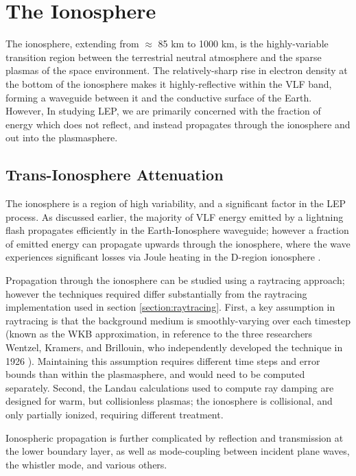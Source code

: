 \section{The Ionosphere}
The ionosphere, extending from $\approx$ 85 km to 1000 km, is the highly-variable transition region between the terrestrial neutral atmosphere and the sparse plasmas of the space environment. The relatively-sharp rise in electron density at the bottom of the ionosphere makes it highly-reflective within the VLF band, forming a waveguide between it and the conductive surface of the Earth. However, In studying LEP, we are primarily concerned with the fraction of energy which does not reflect, and instead propagates through the ionosphere and out into the plasmasphere.

\subsection{Trans-Ionosphere Attenuation}
\label{section:trans_ionosphere_atten}
The ionosphere is a region of high variability, and a significant factor in the LEP process. As discussed earlier, the majority of VLF energy emitted by a lightning flash propagates efficiently in the Earth-Ionosphere waveguide; however a fraction of emitted energy can propagate upwards through the ionosphere, where the wave experiences significant losses via Joule heating in the D-region ionosphere \citep{Graf2013, Blaes2016}.

Propagation through the ionosphere can be studied using a raytracing approach; however the techniques required differ substantially from the raytracing implementation used in section \ref{section:raytracing}. First, a key assumption in raytracing is that the background medium is smoothly-varying over each timestep (known as the WKB approximation, in reference to the three researchers Wentzel, Kramers, and Brillouin, who independently developed the technique in 1926 \citep{Bender1999}). Maintaining this assumption requires different time steps and error bounds than within the plasmasphere, and would need to be computed separately. Second, the Landau calculations used to compute ray damping are designed for warm, but collisionless plasmas; the ionosphere is collisional, and only partially ionized, requiring different treatment.

Ionospheric propagation is further complicated by reflection and transmission at the lower boundary layer, as well as mode-coupling between incident plane waves, the whistler mode, and various others. 

